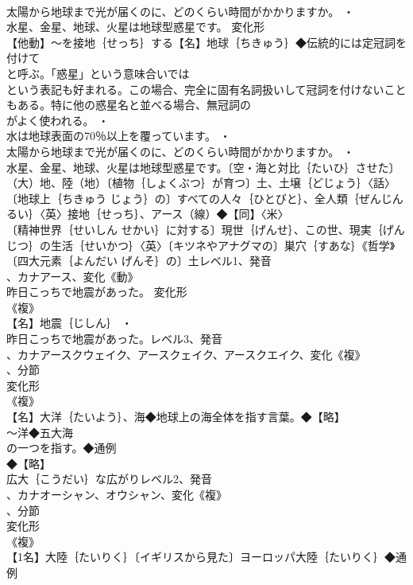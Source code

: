 \documentclass[8pt]{extreport}
\begin{document}
\begin{CJK}{UTF8}{min}
\\	太陽から地球まで光が届くのに、どのくらい時間がかかりますか。 ・
\\	水星、金星、地球、火星は地球型惑星です。	変化形 
\\	【他動】～を接地｛せっち｝する【名】地球｛ちきゅう｝◆伝統的には定冠詞を付けて
\\	と呼ぶ。「惑星」という意味合いでは
\\	という表記も好まれる。この場合、完全に固有名詞扱いして冠詞を付けないこともある。特に他の惑星名と並べる場合、無冠詞の
\\	がよく使われる。 ・
\\	水は地球表面の70％以上を覆っています。 ・
\\	太陽から地球まで光が届くのに、どのくらい時間がかかりますか。 ・
\\	水星、金星、地球、火星は地球型惑星です。〔空・海と対比｛たいひ｝させた〕（大）地、陸（地）〔植物｛しょくぶつ｝が育つ〕土、土壌｛どじょう｝〈話〉〔地球上｛ちきゅう じょう｝の〕すべての人々｛ひとびと｝、全人類｛ぜんじんるい｝〈英〉接地｛せっち｝、アース（線）◆【同】〈米〉
\\	〔精神世界｛せいしん せかい｝に対する〕現世｛げんせ｝、この世、現実｛げんじつ｝の生活｛せいかつ｝〈英〉〔キツネやアナグマの〕巣穴｛すあな｝《哲学》〔四大元素｛よんだい げんそ｝の〕土レベル1、発音
\\	、カナアース、変化《動》
\\	昨日こっちで地震があった。	変化形 
\\	《複》
\\	【名】地震｛じしん｝ ・
\\	昨日こっちで地震があった。レベル3、発音
\\	、カナアースクウェイク、アースクェイク、アースクエイク、変化《複》
\\	、分節
\\	変化形 
\\	《複》
\\	【名】大洋｛たいよう｝、海◆地球上の海全体を指す言葉。◆【略】
\\	～洋◆五大海
\\	の一つを指す。◆通例
\\	◆【略】
\\	広大｛こうだい｝な広がりレベル2、発音
\\	、カナオーシャン、オウシャン、変化《複》
\\	、分節
\\	変化形 
\\	《複》
\\	【1名】大陸｛たいりく｝〔イギリスから見た〕ヨーロッパ大陸｛たいりく｝◆通例

\end{CJK}
\end{document}
